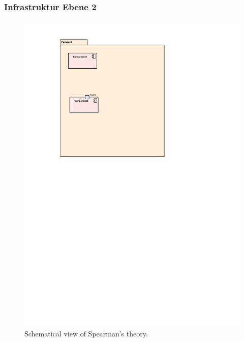 \subsubsection{Infrastruktur Ebene 2}
\label{_infrastruktur_ebene_2}

\begin{figure}[h]
    \centering
    \includegraphics[width=1\textwidth]{dd.pdf}
    \caption{Schematical view of Spearman's theory.}
\end{figure}






